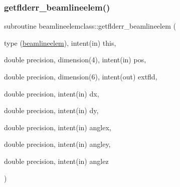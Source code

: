\subsubsection{\texorpdfstring{getflderr\_beamlineelem()}{getflderr\_beamlineelem()}}
{\footnotesize\ttfamily subroutine beamlineelemclass\+::getflderr\+\_\+beamlineelem (\begin{DoxyParamCaption}\item[{type (\mbox{\hyperlink{namespacebeamlineelemclass_structbeamlineelemclass_1_1beamlineelem}{beamlineelem}}), intent(in)}]{this,  }\item[{double precision, dimension(4), intent(in)}]{pos,  }\item[{double precision, dimension(6), intent(out)}]{extfld,  }\item[{double precision, intent(in)}]{dx,  }\item[{double precision, intent(in)}]{dy,  }\item[{double precision, intent(in)}]{anglex,  }\item[{double precision, intent(in)}]{angley,  }\item[{double precision, intent(in)}]{anglez }\end{DoxyParamCaption})}

